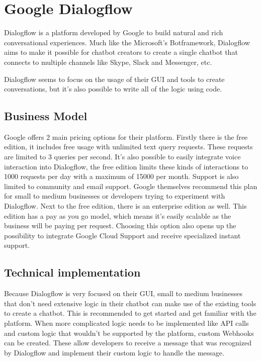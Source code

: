 \chapter{Google Dialogflow}

Dialogflow\cite{dialogflow} is a platform developed by Google to build natural and rich conversational experiences. Much like the Microsoft's Botframework, Dialogflow aims to make it possible for chatbot creators to create a single chatbot that connects to multiple channels like Skype, Slack and Messenger, etc.

Dialogflow seems to focus on the usage of their GUI and tools to create conversations, but it's also possible to write all of the logic using code.

\section{Business Model}

Google offers 2 main pricing options for their platform. Firstly there is the free edition, it includes free usage with unlimited text query requests. These requests are limited to 3 queries per second. It's also possible to easily integrate voice interaction into Dialogflow, the free edition limits these kinds of interactions to 1000 requests per day with a maximum of 15000 per month. Support is also limited to community and email support. Google themselves recommend this plan for small to medium businesses or developers trying to experiment with Dialogflow. Next to the free edition, there is an enterprise edition as well. This edition has a pay as you go model, which means it's easily scalable as the business will be paying per request. Choosing this option also opens up the possibility to integrate Google Cloud Support and receive specialized instant support.

\section{Technical implementation}

Because Dialogflow is very focused on their GUI, small to medium businesses that don't need extensive logic in their chatbot can make use of the existing tools to create a chatbot. This is recommended to get started and get familiar with the platform. When more complicated logic needs to be implemented like API calls and custom logic that wouldn't be supported by the platform, custom \Gls{Webhook}s can be created. These allow developers to receive a message that was recognized by Dialogflow and implement their custom logic to handle the message.

